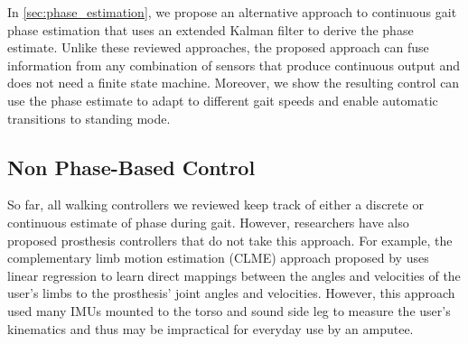 In \cref{sec:phase_estimation}, we propose an alternative approach to continuous
gait phase estimation that uses an extended Kalman filter to derive the phase
estimate. Unlike these reviewed approaches, the proposed approach can fuse
information from any combination of sensors that produce continuous output and
does not need a finite state machine. Moreover, we show the resulting control
can use the phase estimate to adapt to different gait speeds and enable
automatic transitions to standing mode. 

\subsection{Non Phase-Based Control}

So far, all walking controllers we reviewed keep track of either a discrete or
continuous estimate of phase during gait. However, researchers have also
proposed prosthesis controllers that do not take this approach. For example, the
complementary limb motion estimation (CLME) approach proposed by
\citet{vallery2011complementary} uses linear regression to learn direct
mappings between the angles and velocities of the user's limbs to the
prosthesis' joint angles and velocities. However, this approach used many IMUs
mounted to the torso and sound side leg to measure the user's kinematics and
thus may be impractical for everyday use by an amputee.

